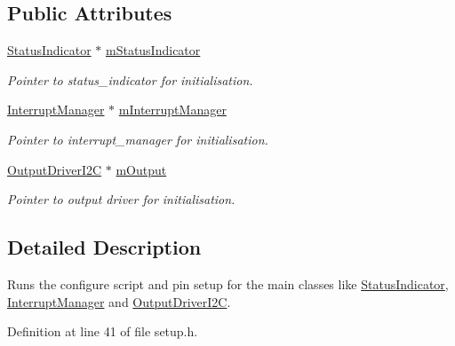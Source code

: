 \subsection*{Public Attributes}
\begin{DoxyCompactItemize}
\item 
\hyperlink{classSPMB_1_1StatusIndicator}{Status\+Indicator} $\ast$ \hyperlink{classSPMB_1_1SetupManager_aee4ada747a7d535d75ae4e54e1396c5f}{m\+Status\+Indicator}\hypertarget{classSPMB_1_1SetupManager_aee4ada747a7d535d75ae4e54e1396c5f}{}\label{classSPMB_1_1SetupManager_aee4ada747a7d535d75ae4e54e1396c5f}

\begin{DoxyCompactList}\small\item\em Pointer to status\+\_\+indicator for initialisation. \end{DoxyCompactList}\item 
\hyperlink{classSPMB_1_1InterruptManager}{Interrupt\+Manager} $\ast$ \hyperlink{classSPMB_1_1SetupManager_a29f2062c536ba2b74bda1937e10d3351}{m\+Interrupt\+Manager}\hypertarget{classSPMB_1_1SetupManager_a29f2062c536ba2b74bda1937e10d3351}{}\label{classSPMB_1_1SetupManager_a29f2062c536ba2b74bda1937e10d3351}

\begin{DoxyCompactList}\small\item\em Pointer to interrupt\+\_\+manager for initialisation. \end{DoxyCompactList}\item 
\hyperlink{classSPMB_1_1OutputDriverI2C}{Output\+Driver\+I2C} $\ast$ \hyperlink{classSPMB_1_1SetupManager_a3cd847b570298f79a6a9d1d86e556377}{m\+Output}\hypertarget{classSPMB_1_1SetupManager_a3cd847b570298f79a6a9d1d86e556377}{}\label{classSPMB_1_1SetupManager_a3cd847b570298f79a6a9d1d86e556377}

\begin{DoxyCompactList}\small\item\em Pointer to output driver for initialisation. \end{DoxyCompactList}\end{DoxyCompactItemize}


\subsection{Detailed Description}
Runs the configure script and pin setup for the main classes like \hyperlink{classSPMB_1_1StatusIndicator}{Status\+Indicator}, \hyperlink{classSPMB_1_1InterruptManager}{Interrupt\+Manager} and \hyperlink{classSPMB_1_1OutputDriverI2C}{Output\+Driver\+I2C}. 

Definition at line 41 of file setup.\+h.

